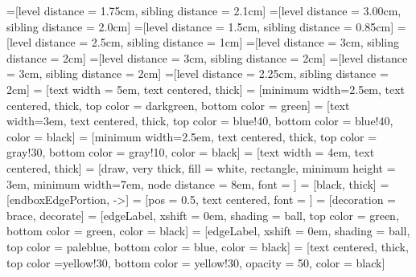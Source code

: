 =[level distance = 1.75cm, sibling distance = 2.1cm]
=[level distance = 3.00cm, sibling distance = 2.0cm]
=[level distance = 1.5cm, sibling distance = 0.85cm]
=[level distance = 2.5cm, sibling distance = 1cm]
=[level distance = 3cm, sibling distance = 2cm]
=[level distance = 3cm, sibling distance = 2cm]
=[level distance = 3cm, sibling distance = 2cm]
=[level distance = 2.25cm, sibling distance = 2cm]
 = [text width = 5em, text centered, thick]
 = [minimum width=2.5em, text centered, thick, top color = darkgreen, bottom color = green]
 = [text width=3em, text centered, thick, top color = blue!40, bottom color = blue!40, color = black] 
 = [minimum width=2.5em, text centered, thick, top color = gray!30, bottom color = gray!10, color = black]
 = [text width = 4em, text centered, thick]
 = [draw, very thick, fill = white, rectangle, 
	minimum height = 3em, minimum width=7em, 
	node distance = 8em, font = {\sffamily\bfseries}]
 = [black, thick]
 = [endboxEdgePortion, ->]
 = [pos = 0.5, text centered, font = {\sffamily\small}]
 = [decoration = {brace}, decorate]
 = [edgeLabel, xshift = 0em, shading = ball,
				top color = green, bottom color = green, color = black]
 = [edgeLabel, xshift = 0em, shading = ball,
				top color = paleblue, bottom color = blue, color = black]
 = [text centered, thick, top color =yellow!30, 
				bottom color = yellow!30, opacity = 50, color = black]
